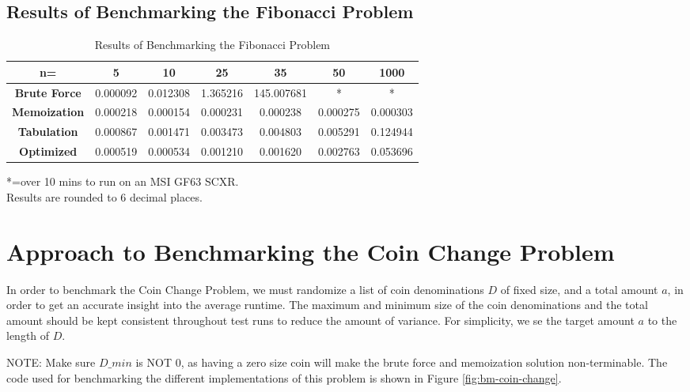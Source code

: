 \subsection{Results of Benchmarking the Fibonacci Problem}
\begin{table}[H]
    \centering
    \begin{tabular}{|c|c|c|c|c|c|c|}
        \hline
        \textbf{n=}  & \textbf{5} & \textbf{10} & \textbf{25} & \textbf{35} & \textbf{50}  & \textbf{1000} \\
        \hline
        \textbf{Brute Force} & 0.000092 & 0.012308 & 1.365216 & 145.007681 & * & * \\
        \hline
        \textbf{Memoization} & 0.000218 & 0.000154 & 0.000231 & 0.000238 & 0.000275 & 0.000303 \\
        \hline
        \textbf{Tabulation} & 0.000867 & 0.001471 & 0.003473 & 0.004803 & 0.005291 & 0.124944 \\
        \hline
        \textbf{Optimized} & 0.000519 & 0.000534 & 0.001210 & 0.001620 & 0.002763 & 0.053696 \\
        \hline
    \end{tabular}
    \caption{Results of Benchmarking the Fibonacci Problem}
\end{table}

*=over 10 mins to run on an MSI GF63 SCXR.\\
Results are rounded to 6 decimal places.


\section{Approach to Benchmarking the Coin Change Problem}

In order to benchmark the Coin Change Problem, we must randomize a list of coin denominations $D$ of fixed size, and a total amount $a$, in order to get an accurate insight into the average runtime.
The maximum and minimum size of the coin denominations and the total amount should be kept consistent throughout test runs to reduce the amount of variance.
For simplicity, we se the target amount $a$ to the length of $D$.

NOTE: Make sure $D\_min$ is NOT 0, as having a zero size coin will make the brute force and memoization solution non-terminable.
The code used for benchmarking the different implementations of this problem is shown in Figure \ref{fig:bm-coin-change}.

